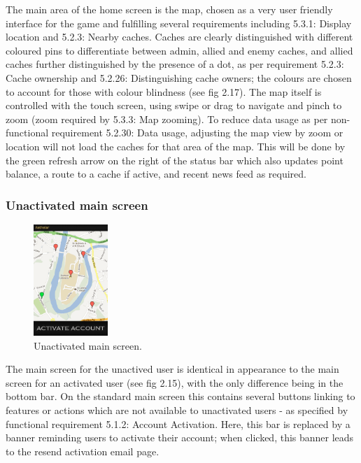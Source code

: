 The main area of the home screen is the map, chosen as a very user friendly interface for the game and fulfilling several requirements including 5.3.1: Display location and 5.2.3: Nearby caches. Caches are clearly distinguished with different coloured pins to differentiate between admin, allied and enemy caches, and allied caches further distinguished by the presence of a dot, as per requirement 5.2.3: Cache ownership and 5.2.26: Distinguishing cache owners; the colours are chosen to account for those with colour blindness (see fig 2.17). The map itself is controlled with the touch screen, using swipe or drag to navigate and pinch to zoom (zoom required by 5.3.3: Map zooming). To reduce data usage as per non-functional requirement 5.2.30: Data usage, adjusting the map view by zoom or location will not load the caches for that area of the map. This will be done by the green refresh arrow on the right of the status bar which also updates point balance, a route to a cache if active, and recent news feed as required.

\subsubsection{Unactivated main screen}

\begin{figure}
	\vspace{-80pt}
	\begin{center}
	\includegraphics[width=0.25\textwidth]{images/unauthorised_main_mockup}
	\caption{Unactivated main screen.}
	\label{unactivated_main}
	\end{center}
	\vspace{-20pt}
\end{figure}

The main screen for the unactived user is identical in appearance to the main screen for an activated user (see fig 2.15), with the only difference being in the bottom bar. On the standard main screen this contains several buttons linking to features or actions which are not available to unactivated users - as specified by functional requirement 5.1.2: Account Activation. Here, this bar is replaced by a banner reminding users to activate their account; when clicked, this banner leads to the resend activation email page.

